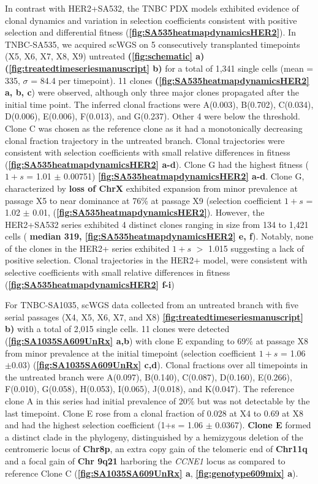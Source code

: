 In contrast with HER2+SA532, the TNBC PDX models exhibited evidence of clonal dynamics and variation in selection coefficients consistent with positive selection and differential fitness (\textbf{\autoref{fig:SA535heatmapdynamicsHER2}}). 
In TNBC-SA535, we acquired scWGS on 5 consecutively transplanted timepoints (X5, X6, X7, X8, X9) untreated \textbf{(\autoref{fig:schematic} a)} \textbf{(\autoref{fig:treatedtimeseriesmanuscript} b)} for a total of 1,341 single cells (mean = 335, $\sigma$ = 84.4 per timepoint).
11 clones \textbf{(\autoref{fig:SA535heatmapdynamicsHER2} a, b, c}) were observed, although only three major clones propagated after the initial time point.
The inferred clonal fractions were A(0.003), B(0.702), C(0.034), D(0.006), E(0.006), F(0.013), and G(0.237). Other 4 were below the threshold.
Clone C was chosen as the reference clone as it had a monotonically decreasing clonal fraction trajectory in the untreated branch. Clonal trajectories were consistent with selection coefficients
with small relative differences in fitness (\textbf{\autoref{fig:SA535heatmapdynamicsHER2} a-d}). Clone G had the highest fitness ($1+s$ = 1.01 $\pm$ 0.00751) \textbf{\autoref{fig:SA535heatmapdynamicsHER2} a-d}. 
 Clone G, characterized by \textbf{loss of ChrX} exhibited expansion from minor prevalence at passage X5 to near dominance at 76\% at passage X9 (selection coefficient $1+s$ = 1.02  $\pm$  0.01, (\textbf{\autoref{fig:SA535heatmapdynamicsHER2}}). 
 However, the HER2+SA532 series exhibited 4 distinct clones ranging in size from 134 to 1,421 cells ( \textbf{median 319, \textbf{\autoref{fig:SA535heatmapdynamicsHER2} e, f}}). Notably, none of the clones in the HER2+ series exhibited $1+s$ $>$ 1.015 suggesting a lack of positive selection.
 Clonal trajectories in the HER2+ model, were consistent with selective coefficients with small relative differences in fitness (\textbf{\autoref{fig:SA535heatmapdynamicsHER2} f-i})


For TNBC-SA1035, scWGS data collected from an untreated branch with five serial passages (X4, X5, X6, X7, and X8) \textbf{\autoref{fig:treatedtimeseriesmanuscript} b)} with a total of 2,015 single cells. 11 clones were detected (\textbf{\autoref{fig:SA1035SA609UnRx} a,b}) with clone E expanding to 69\% at passage X8 from minor prevalence at the initial timepoint (selection coefficient $1+s$ = 1.06 $\pm$0.03) (\textbf{\autoref{fig:SA1035SA609UnRx} c,d}). Clonal fractions over all timepoints in the untreated branch were A(0.097), B(0.140), C(0.087), D(0.160), E(0.266), F(0.010), G(0.058), H(0.053), I(0.065), J(0.018), and K(0.047). The reference clone A in this series had initial prevalence of 20\% but was not detectable by the last timepoint. Clone E rose from a clonal fraction of 0.028 at X4 to 0.69 at X8 and had the highest selection coefficient (1+s = 1.06 $\pm$ 0.0367). \textbf{Clone E} formed a distinct clade in the phylogeny, distinguished by a hemizygous deletion of the centromeric locus of \textbf{Chr8p}, an extra copy gain of the telomeric end of \textbf{Chr11q} and a focal gain of \textbf{Chr 9q21} harboring the \textit{CCNE1} locus as compared to reference Clone C (\textbf{\autoref{fig:SA1035SA609UnRx} a}, \textbf{\autoref{fig:genotype609mix} a}).

